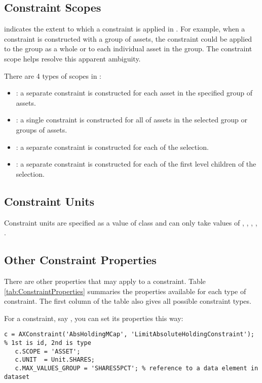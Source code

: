 \subsection{Constraint Scopes}
 indicates the extent to which a constraint is applied in \axioma{}.
For example, when a constraint is constructed with a group of assets, the constraint could be
applied to the group as a whole or to each individual asset in the group.
The constraint scope helps resolve this apparent ambiguity.

There are 4 types of scopes in \axioma{}:

\begin{itemize}
  \item {}: a separate constraint is constructed for each asset in the specified group of assets.
  \item {}: a single constraint is constructed for all of assets in the selected group or groups of assets.
  \item {}: a separate constraint is constructed for each of the selection.
  \item {}: a separate constraint is constructed for each of the first level children of the selection.
\end{itemize}

\subsection{Constraint Units}
Constraint units are specified as a value of class  and
can only take values of , , , , .

\subsection{Other Constraint Properties}

There are other properties that may apply to a constraint. 
Table \ref{tab:ConstraintProperties} summaries the properties available for each type of constraint.
The first column of the table also gives all possible constraint types.

For a constraint, say , you can set its properties this way:

\begin{lstlisting}[numbers=none]
   c = AXConstraint('AbsHoldingMCap', 'LimitAbsoluteHoldingConstraint'); % 1st is id, 2nd is type
   c.SCOPE = 'ASSET';
   c.UNIT  = Unit.SHARES;
   c.MAX_VALUES_GROUP = 'SHARES5PCT'; % reference to a data element in dataset
\end{lstlisting}

